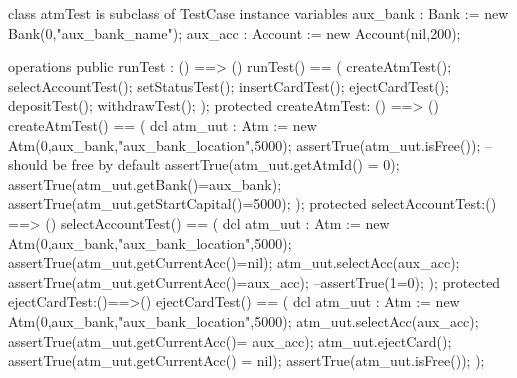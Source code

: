 \documentclass[a4paper]{article}
\begin{document}
\title{}
\author{}
\begin{vdm_al}

class atmTest is subclass of TestCase
instance variables
    aux_bank : Bank := new Bank(0,"aux_bank_name");
    aux_acc : Account := new Account(nil,200); 

operations
    public runTest : () ==> ()
    runTest() == (
        createAtmTest();
        selectAccountTest();
        setStatusTest();
        insertCardTest();
        ejectCardTest();
        depositTest();
        withdrawTest();
    );
    protected createAtmTest: () ==> ()
    createAtmTest() == (
        dcl atm_uut : Atm := new Atm(0,aux_bank,"aux_bank_location",5000); 
        assertTrue(atm_uut.isFree()); --should be free by default
        assertTrue(atm_uut.getAtmId() = 0);
        assertTrue(atm_uut.getBank()=aux_bank);
        assertTrue(atm_uut.getStartCapital()=5000);
    ); 
    protected selectAccountTest:() ==> ()
    selectAccountTest() == (
        dcl atm_uut : Atm := new Atm(0,aux_bank,"aux_bank_location",5000); 
        assertTrue(atm_uut.getCurrentAcc()=nil);
        atm_uut.selectAcc(aux_acc);
        assertTrue(atm_uut.getCurrentAcc()=aux_acc);
        --assertTrue(1=0);
    );
    protected ejectCardTest:()==>()
    ejectCardTest() == (
        dcl atm_uut : Atm := new Atm(0,aux_bank,"aux_bank_location",5000); 
        atm_uut.selectAcc(aux_acc);
        assertTrue(atm_uut.getCurrentAcc()= aux_acc);
        atm_uut.ejectCard();
        assertTrue(atm_uut.getCurrentAcc() = nil);
        assertTrue(atm_uut.isFree());
    );


\end{vdm_al}
\end{document}
